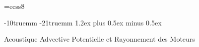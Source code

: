 \makeatletter
\def\cleardoublepage{\clearpage\if@twoside \ifodd\c@page\else
\hbox{}
\thispagestyle{plain}
\newpage
\if@twocolumn\hbox{}\newpage\fi\fi\fi}
\makeatother

\font\mysf=ecss8


\setlength{\textwidth}{150truemm}
\setlength{\textheight}{230truemm}
\setlength{\topmargin}{10truemm}
\hoffset -10truemm    %
\voffset -21truemm    %
\parindent 4mm
\parskip 1.2ex plus 0.5ex minus 0.5ex
\makeatletter
\def\section{\@startsection {section}{1}{\z@}{-3.5ex plus -1ex minus
    -.2ex}{2.3ex plus .2ex}{\large\bf}}
\makeatother
\pagestyle{myheadings}
          {\centerline{ Acoustique Advective Potentielle et Rayonnement des Moteurs }}
